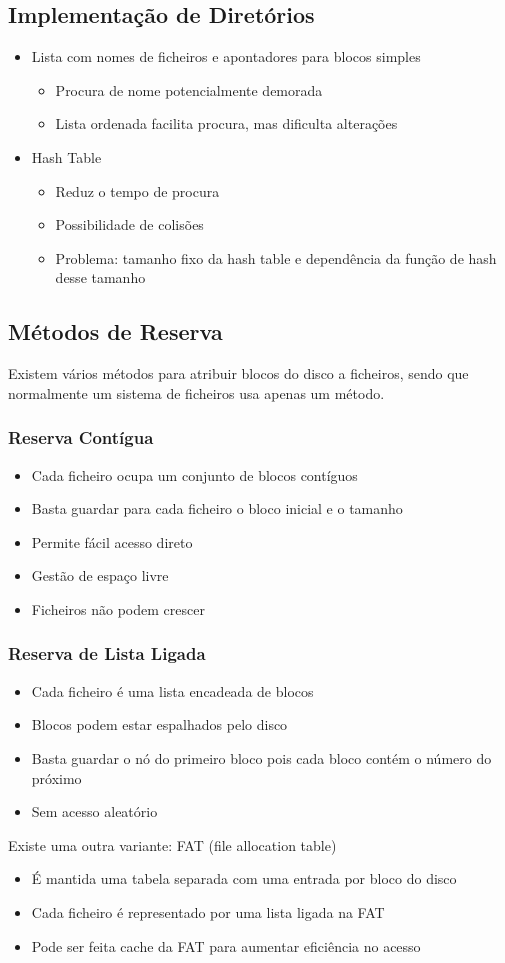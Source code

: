 \documentclass[10pt,a4paper]{report}
\begin{document}
\subsection{Implementação de Diretórios}
\begin{itemize}
\item Lista com nomes de ficheiros e apontadores para blocos simples
\begin{itemize}
\item Procura de nome potencialmente demorada
\item Lista ordenada facilita procura, mas dificulta alterações
\end{itemize}
\item Hash Table
\begin{itemize}
\item Reduz o tempo de procura
\item Possibilidade de colisões
\item Problema: tamanho fixo da hash table e dependência da função de hash desse tamanho
\end{itemize}
\end{itemize}
\subsection{Métodos de Reserva}
Existem vários métodos para atribuir blocos do disco a ficheiros, sendo que normalmente um sistema de ficheiros usa apenas um método.
\subsubsection{Reserva Contígua}
\begin{itemize}
\item Cada ficheiro ocupa um conjunto de blocos contíguos
\item Basta guardar para cada ficheiro o bloco inicial e o tamanho
\item Permite fácil acesso direto
\item Gestão de espaço livre
\item Ficheiros não podem crescer
\end{itemize}
\subsubsection{Reserva de Lista Ligada}
\begin{itemize}
\item Cada ficheiro é uma lista encadeada de blocos
\item Blocos podem estar espalhados pelo disco
\item Basta guardar o nó do primeiro bloco pois cada bloco contém o número do próximo
\item Sem acesso aleatório
\end{itemize}
Existe uma outra variante: FAT (file allocation table)
\begin{itemize}
\item É mantida uma tabela separada com uma entrada por bloco do disco
\item Cada ficheiro é representado por uma lista ligada na FAT
\item Pode ser feita cache da FAT para aumentar eficiência no acesso
\end{itemize}
\end{document}
